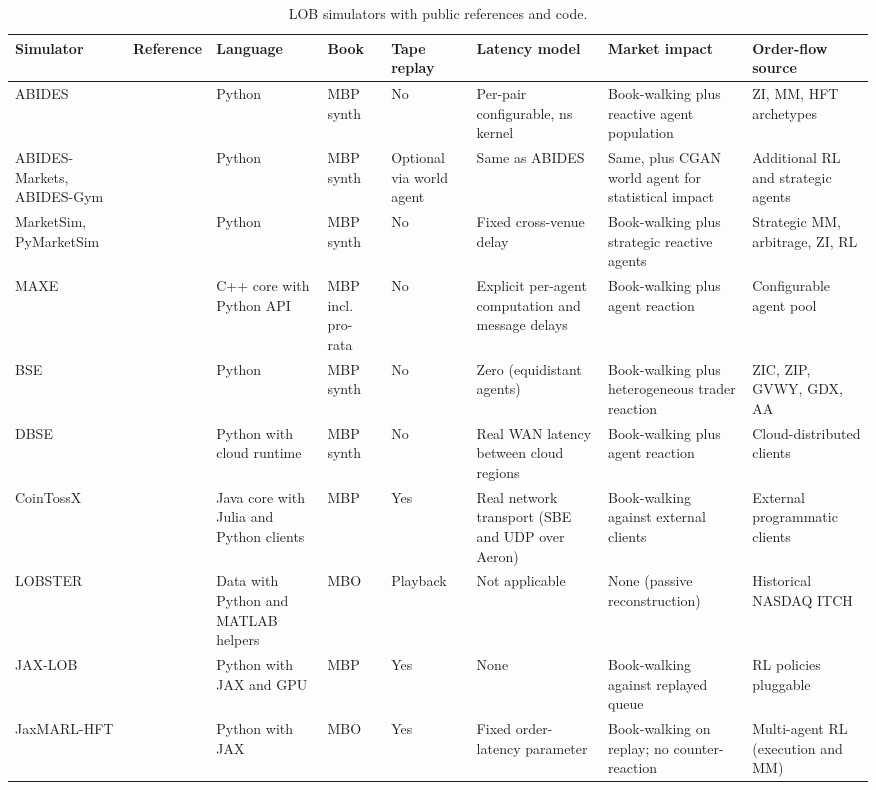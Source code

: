 \documentclass[11pt]{article}
\begin{document}
\begin{table}
\centering
\scriptsize
\caption{LOB simulators with public references and code.}
\label{tab:simulators}
\begin{tabular}{@{}p{1.9cm}p{1.9cm}p{2.2cm}p{1.9cm}p{2.1cm}p{3.1cm}p{3.1cm}p{3.0cm}@{}}
\toprule
Simulator & Reference & Language & Book & Tape replay & Latency model & Market impact & Order-flow source \\
\midrule
ABIDES & \citet{byrd2020abides} & Python & MBP synth & No & Per-pair configurable, ns kernel & Book-walking plus reactive agent population & ZI, MM, HFT archetypes \\
ABIDES-Markets, ABIDES-Gym & \citet{amrouni2021abidesgym} & Python & MBP synth & Optional via world agent & Same as ABIDES & Same, plus CGAN world agent for statistical impact & Additional RL and strategic agents \\
MarketSim, PyMarketSim & \citet{masciolwellman2024pymarketsim} & Python & MBP synth & No & Fixed cross-venue delay & Book-walking plus strategic reactive agents & Strategic MM, arbitrage, ZI, RL \\
MAXE & \citet{belcak2020maxe} & C++ core with Python API & MBP incl. pro-rata & No & Explicit per-agent computation and message delays & Book-walking plus agent reaction & Configurable agent pool \\
BSE & \citet{cliff2018bse} & Python & MBP synth & No & Zero (equidistant agents) & Book-walking plus heterogeneous trader reaction & ZIC, ZIP, GVWY, GDX, AA \\
DBSE & \citet{milescliff2019dbse} & Python with cloud runtime & MBP synth & No & Real WAN latency between cloud regions & Book-walking plus agent reaction & Cloud-distributed clients \\
CoinTossX & \citet{jericevich2022cointossx} & Java core with Julia and Python clients & MBP & Yes & Real network transport (SBE and UDP over Aeron) & Book-walking against external clients & External programmatic clients \\
LOBSTER & \citet{huangpolak2011lobster} & Data with Python and MATLAB helpers & MBO & Playback & Not applicable & None (passive reconstruction) & Historical NASDAQ ITCH \\
JAX-LOB & \citet{frey2023jaxlob} & Python with JAX and GPU & MBP & Yes & None & Book-walking against replayed queue & RL policies pluggable \\
JaxMARL-HFT & \citet{mohl2025jaxmarl} & Python with JAX & MBO & Yes & Fixed order-latency parameter & Book-walking on replay; no counter-reaction & Multi-agent RL (execution and MM) \\

\end{tabular}
\end{table}
\end{document}

